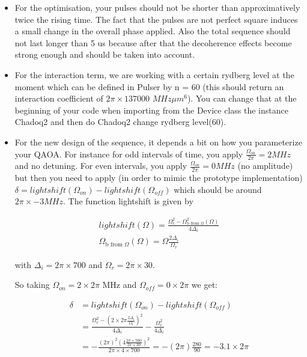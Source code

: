 \documentclass{article}
\begin{document}
\begin{itemize}
	\item For the optimisation, your pulses should not be shorter than approximatively twice the rising time. The fact that the pulses are not perfect square induces a small change in the overall phase applied. 
Also the total sequence should not last longer than 5 us because after that the decoherence effects become strong enough and should be taken into account.

	\item For the interaction term, we are working with a certain rydberg level at the moment which can be defined in Pulser by n = 60 (this should return an interaction coefficient of $2 \pi \times 137 000$ $MHz \mu m^6$). You can change that at the beginning of your code when importing from the Device class the instance Chadoq2 and then do Chadoq2 change rydberg level(60).
	
	\item For the new design of the sequence, it depends a bit on how you parameterize your QAOA. For instance for odd intervals of time, you apply $\frac{\Omega_{on}}{2 \pi} = 2 MHz$  and no detuning. For even intervals, you apply $\frac{\Omega_{on}}{2 \pi} = 0 MHz$ (no amplitude) but then you need to apply (in order to mimic the prototype implementation) $\delta = lightshift(\Omega_{on}) - lightshift(\Omega_{off})$ which should be around $2 \pi \times -3 MHz$. 
The function lightshift is given by 

\begin{align}
	lightshift(\Omega) = \frac{\Omega_r^2-\Omega_{\text{b from } \Omega}^2(\Omega)}{4 \Delta_i} \\
	\Omega_{\text{b from } \Omega}(\Omega) = \Omega \frac{2 \Delta_i}{\Omega_r}
\end{align}

with $\Delta_i = 2\pi \times 700$ and $\Omega_r = 2 \pi \times 30$.

So taking $\Omega_{on} = 2 \times 2 \pi $ MHz and $\Omega_{off} = 0 \times 2 \pi $ we get:

\begin{align}
	\delta &= lightshift(\Omega_{on}) - lightshift(\Omega_{off}) \\
	 &= \frac{\Omega_r^2 - (2\times 2\pi \frac{2 \Delta_i}{\Omega_r})^2}{4 \Delta_i} - \frac{\Omega_r^2}{4 \Delta_i} \\
	 &= -\frac{(2\pi)^2 (4 \frac{2\pi \times 700}{2 \pi \times 30})^2}{2 \pi \times 4 \times 700} = -(2 \pi) \frac{280}{90} = -3.1 \times 2\pi
\end{align}
\end{itemize}
\end{document}
